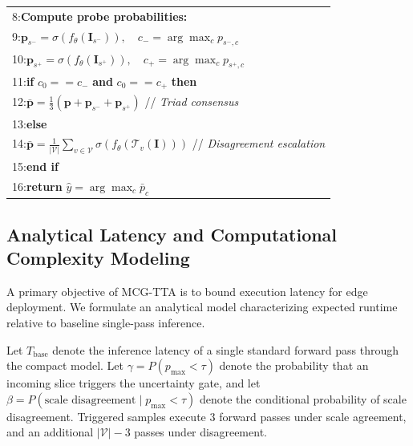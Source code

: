 ﻿\documentclass[journal]{IEEEtran}
\begin{document}
\begin{table}[h]
\begin{tabular}{p{}}
8:\hspace{1em}\textbf{Compute probe probabilities:} \\
9:\hspace{2em}$\mathbf{p}_{s^-} = \sigma(f_\theta(\mathbf{I}_{s^-})), \quad c_- = \arg\max_c p_{s^-, c}$ \\
10:\hspace{1.5em}$\mathbf{p}_{s^+} = \sigma(f_\theta(\mathbf{I}_{s^+})), \quad c_+ = \arg\max_c p_{s^+, c}$ \\
11:\hspace{0.5em}\textbf{if} $c_0 == c_-$ \textbf{and} $c_0 == c_+$ \textbf{then} \\
12:\hspace{1.5em}$\bar{\mathbf{p}} = \frac{1}{3}(\mathbf{p} + \mathbf{p}_{s^-} + \mathbf{p}_{s^+})$ \hfill // \emph{Triad consensus} \\
13:\hspace{0.5em}\textbf{else} \\
14:\hspace{1.5em}$\bar{\mathbf{p}} = \frac{1}{|\mathcal{V}|} \sum_{v \in \mathcal{V}} \sigma(f_\theta(\mathcal{T}_v(\mathbf{I})))$ \hfill // \emph{Disagreement escalation} \\
15:\hspace{0.5em}\textbf{end if} \\
16:\hspace{0.5em}\textbf{return} $\hat{y} = \arg\max_c \bar{p}_c$ \\
\bottomrule
\end{tabular}
\label{alg:mcg_tta}
\end{table}

\subsection{Analytical Latency and Computational Complexity Modeling}

A primary objective of MCG-TTA is to bound execution latency for edge deployment. We formulate an analytical model characterizing expected runtime relative to baseline single-pass inference.

Let $T_{\text{base}}$ denote the inference latency of a single standard forward pass through the compact model. Let $\gamma = P(p_{\max} < \tau)$ denote the probability that an incoming slice triggers the uncertainty gate, and let $\beta = P(\text{scale disagreement} \mid p_{\max} < \tau)$ denote the conditional probability of scale disagreement. Triggered samples execute 3 forward passes under scale agreement, and an additional $|\mathcal{V}| - 3$ passes under disagreement.
\end{document}
